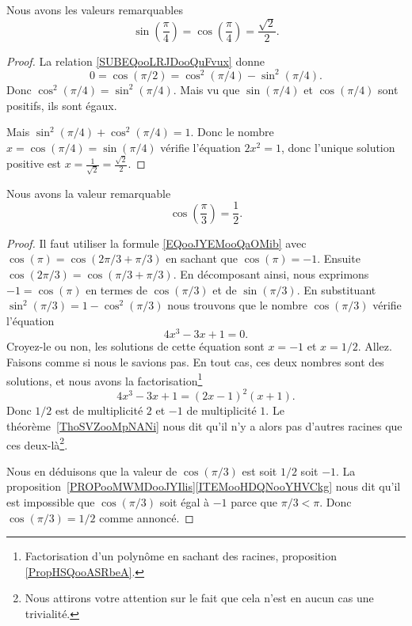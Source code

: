 \begin{lemma}       \label{LEMooIGNPooPEctJy}
    Nous avons les valeurs remarquables
    \begin{equation}
        \sin(\frac{ \pi }{ 4 })=\cos(\frac{ \pi }{ 4 })=\frac{ \sqrt{ 2 } }{2}.
    \end{equation}
\end{lemma}

\begin{proof}
    La relation \eqref{SUBEQooLRJDooQuFvux} donne
    \begin{equation}
        0=\cos(\pi/2)=\cos^2(\pi/4)-\sin^2(\pi/4).
    \end{equation}
    Donc \( \cos^2(\pi/4)=\sin^2(\pi/4)\). Mais vu que \( \sin(\pi/4)\) et \( \cos(\pi/4)\) sont positifs, ils sont égaux.

    Mais \( \sin^2(\pi/4)+\cos^2(\pi/4)=1\). Donc le nombre \( x=\cos(\pi/4)=\sin(\pi/4)\) vérifie l'équation \( 2x^2=1\), donc l'unique solution positive est \( x=\frac{1}{ \sqrt{ 2 } }=\frac{ \sqrt{ 2 } }{2}\).
\end{proof}

\begin{lemma}       \label{LEMooRMHAooDEAPMw}
    Nous avons la valeur remarquable
    \begin{equation}
        \cos(\frac{ \pi }{ 3 })=\frac{ 1 }{2}.
    \end{equation}
\end{lemma}

\begin{proof}
    Il faut utiliser la formule \eqref{EQooJYEMooQaOMib} avec \( \cos(\pi)=\cos(2\pi/3+\pi/3)\) en sachant que \( \cos(\pi)=-1\). Ensuite \( \cos(2\pi/3)=\cos(\pi/3+\pi/3)\). En décomposant ainsi, nous exprimons \( -1=\cos(\pi)\) en termes de \( \cos(\pi/3)\) et de \( \sin(\pi/3)\). En substituant \( \sin^2(\pi/3)=1-\cos^2(\pi/3)\) nous trouvons que le nombre \( \cos(\pi/3)\) vérifie l'équation
    \begin{equation}
        4x^3-3x+1=0.
    \end{equation}
    Croyez-le ou non, les solutions de cette équation sont \( x=-1\) et \( x=1/2\). Allez. Faisons comme si nous le savions pas. En tout cas, ces deux nombres sont des solutions, et nous avons la factorisation\footnote{Factorisation d'un polynôme en sachant des racines, proposition \ref{PropHSQooASRbeA}.}
    \begin{equation}
        4x^3-3x+1=(2x-1)^2(x+1).
    \end{equation}
    Donc \( 1/2\) est de multiplicité \( 2\) et \( -1\) de multiplicité \( 1\). Le théorème~\ref{ThoSVZooMpNANi} nous dit qu'il n'y a alors pas d'autres racines que ces deux-là\footnote{Nous attirons votre attention sur le fait que cela n'est en aucun cas une trivialité.}.

    Nous en déduisons que la valeur de \( \cos(\pi/3)\) est soit \( 1/2\) soit \( -1\). La proposition~\ref{PROPooMWMDooJYIlis}\ref{ITEMooHDQNooYHVCkg} nous dit qu'il est impossible que \( \cos(\pi/3)\) soit égal à \( -1\) parce que \( \pi/3<\pi\). Donc \( \cos(\pi/3)=1/2\) comme annoncé.
\end{proof}

